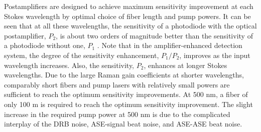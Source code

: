 Postamplifiers are designed to achieve maximum sensitivity improvement at each Stokes wavelength by optimal choice of fiber length and pump powers. It can be seen that at all these wavelengths, the sensitivity of a photodiode with the optical postamplifier, $P_2$, is about two orders of magnitude better than the sensitivity of a photodiode without one, $P_1$ . Note that in the amplifier-enhanced detection system, the degree of the sensitivity enhancement, $P_1/P_2$, improves as the input wavelength increases. Also, the sensitivity, $P_2$, enhances at longer Stokes wavelengths. Due to the large Raman gain coefficients at shorter wavelengths, comparably short fibers and pump lasers with relatively small powers are sufficient to reach the optimum sensitivity improvements. At 500 nm, a fiber of only 100 m is required to reach the optimum sensitivity improvement. The slight increase in the required pump power at 500 nm is due to the complicated interplay of the DRB noise, ASE-signal beat noise, and ASE-ASE beat noise.

